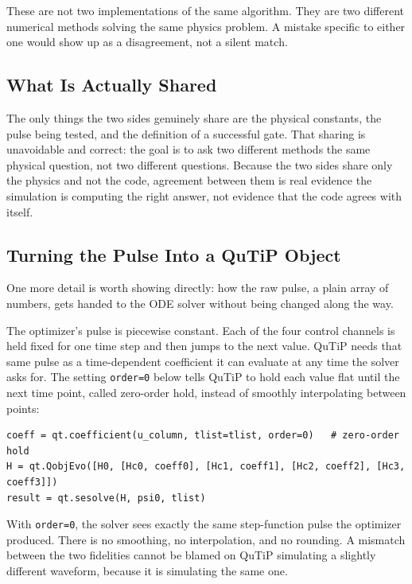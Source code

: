 \documentclass[11pt]{article}
\begin{document}
These are not two implementations of the same algorithm. They are two different numerical methods
solving the same physics problem. A mistake specific to either one would show up as a
disagreement, not a silent match.

\subsection{What Is Actually Shared}

The only things the two sides genuinely share are the physical constants, the pulse being tested,
and the definition of a successful gate. That sharing is unavoidable and correct: the goal is to
ask two different methods the same physical question, not two different questions. Because the
two sides share only the physics and not the code, agreement between them is real evidence the
simulation is computing the right answer, not evidence that the code agrees with itself.

\subsection{Turning the Pulse Into a QuTiP Object}

One more detail is worth showing directly: how the raw pulse, a plain array of numbers, gets
handed to the ODE solver without being changed along the way.

The optimizer's pulse is piecewise constant. Each of the four control channels is held fixed for
one time step and then jumps to the next value. QuTiP needs that same pulse as a time-dependent
coefficient it can evaluate at any time the solver asks for. The setting \texttt{order=0} below
tells QuTiP to hold each value flat until the next time point, called zero-order hold, instead of
smoothly interpolating between points:

\begin{lstlisting}
coeff = qt.coefficient(u_column, tlist=tlist, order=0)   # zero-order hold
H = qt.QobjEvo([H0, [Hc0, coeff0], [Hc1, coeff1], [Hc2, coeff2], [Hc3, coeff3]])
result = qt.sesolve(H, psi0, tlist)
\end{lstlisting}

With \texttt{order=0}, the solver sees exactly the same step-function pulse the optimizer
produced. There is no smoothing, no interpolation, and no rounding. A mismatch between the two
fidelities cannot be blamed on QuTiP simulating a slightly different waveform, because it is
simulating the same one.
\end{document}
